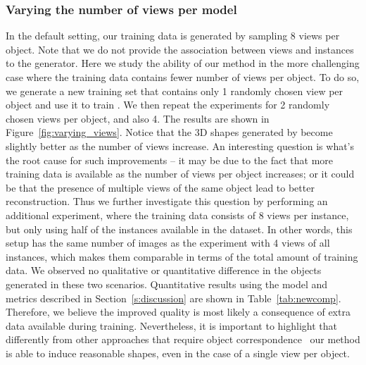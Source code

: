 \subsubsection{Varying the number of views per model} 
In the default setting, our training data is generated by sampling 8 views per
object. 
Note that we do not provide the association between views and instances
to the generator.
Here we study the ability of our method in the more challenging case
where the training data contains fewer number of views per object. 
To do so, we generate a new training set that contains only 1 randomly
chosen view per object and use it to train \prgan. We then repeat the
experiments for 2 randomly chosen views per object, and also 4. The
results are shown in Figure~\ref{fig:varying_views}. 
Notice that the 3D shapes generated by \prgan become slightly better as the number of views
increase. 
An interesting question is what's the root cause for such improvements -- it may be due to the fact 
that more training data is available as the number of views per object increases; or it could be that the presence of multiple views of the same object lead to better reconstruction.
Thus we further investigate this question by performing an additional experiment, where the training data consists of 8 views per instance, but only using half of the instances available in the dataset.
In other words, this setup has the same number of images as the experiment with 4 views of all instances,
which makes them comparable in terms of the total amount of training data.
We observed no qualitative or quantitative difference in the objects generated in these two scenarios.
Quantitative results using the model and metrics described in Section~\ref{s:discussion} are shown
in Table~\ref{tab:newcomp}.
Therefore, we believe the improved quality is most likely a consequence of extra data available during training.
Nevertheless, it is important to highlight that differently from other approaches that require object correspondence~\cite{yan2016perspective,mvcTulsiani18}
our method is able to induce reasonable shapes, even in the case of a single view per object.







